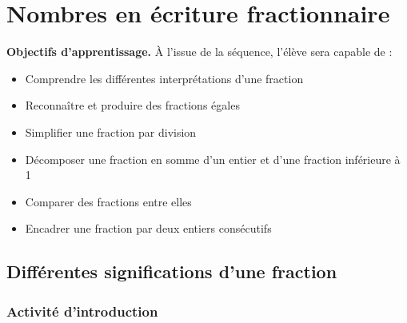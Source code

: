 \chapter{Nombres en écriture fractionnaire}

\begin{objectifsbox}
	\textbf{Objectifs d'apprentissage.} À l'issue de la séquence, l'élève sera capable de :
	\begin{itemize}
		\item Comprendre les différentes interprétations d'une fraction
		\item Reconnaître et produire des fractions égales
		\item Simplifier une fraction par division
		\item Décomposer une fraction en somme d'un entier et d'une fraction inférieure à 1
		\item Comparer des fractions entre elles
		\item Encadrer une fraction par deux entiers consécutifs
	\end{itemize}
\end{objectifsbox}

\section{Différentes significations d'une fraction}

\subsection{Activité d'introduction}

